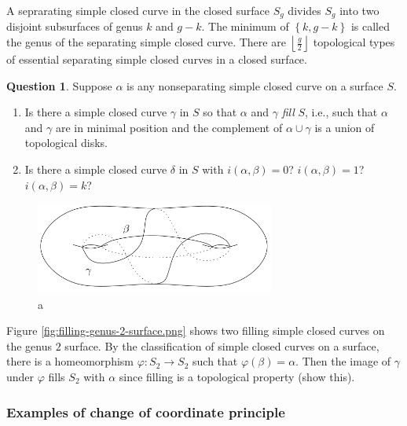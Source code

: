 \documentclass[reqno]{amsart}
\theoremstyle{definition}
\newtheorem{question}[theorem]{Question}
\theoremstyle{remark}
\begin{document}
A seprarating simple closed curve in the closed surface
$S_g$ divides $S_g$ into two disjoint subsurfaces of genus
$k$ and $g-k$. The minimum of $\left\{ k, g-k \right\} $ is
called the genus of the separating simple closed curve. 
There are $\left\lfloor \frac{g}{2} \right\rfloor$ topological
types of essential separating simple closed curves in
a closed surface.

\begin{question}
    Suppose $\alpha$ is any nonseparating simple closed curve
    on a surface $S$.
    \begin{enumerate}
        \item Is there a simple closed curve
            $\gamma$ in $S$ so that $\alpha$ and $\gamma$ 
            \textit{fill} $S$, i.e., such that
            $\alpha$ and $\gamma$ are in minimal position
            and the complement of $\alpha \cup  \gamma$ is
            a union of topological disks.
        \item Is there a simple closed curve $\delta$ in
            $S$ with $i(\alpha,\beta) = 0$? $i(\alpha,\beta)=1$?
            $i(\alpha,\beta)=k$?
    \end{enumerate}
\end{question}

\begin{figure}[htpb]
    \centering
    \includegraphics[width=0.7\textwidth]{filling-genus-2-surface.png}
    \caption{a}
    \label{fig:filling-genus-2-surface-png}
\end{figure}

Figure \ref{fig:filling-genus-2-surface.png} shows
two filling simple closed curves on the genus $2$ surface.
By the classification of simple closed curves on a surface,
there is a homeomorphism $\varphi \colon S_2 \to S_2$ such
that $\varphi\left( \beta \right) =\alpha$. Then
the image of $\gamma$ under $\varphi$ fills $S_2$ with
$\alpha$ since filling is a topological property (show this).

\subsubsection*{Examples of change of coordinate principle}
\end{document}

